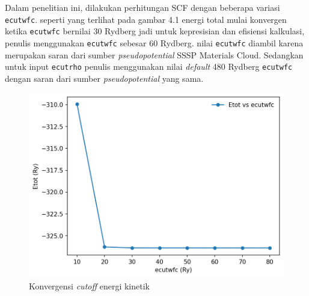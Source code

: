 Dalam penelitian ini, dilakukan perhitungan SCF dengan beberapa variasi \texttt{ecutwfc}. seperti yang terlihat pada gambar 4.1 energi total mulai konvergen ketika \texttt{ecutwfc} bernilai 30 Rydberg jadi untuk kepresisian dan efisiensi kalkulasi, penulis menggunakan \texttt{ecutwfc} sebesar 60 Rydberg. nilai \texttt{ecutwfc} diambil karena merupakan saran dari sumber \textit{pseudopotential} SSSP Materials Cloud. Sedangkan untuk input \texttt{ecutrho} penulis menggunakan nilai \textit{default} 480 Rydberg \texttt{ecutwfc} dengan saran dari sumber \textit{pseudopotential} yang sama.

\begin{figure}
    \centering
    \includegraphics[width=15cm]{./gambar/plot_ecut_sn.png}
    \caption{Konvergensi \textit{cutoff} energi kinetik}
    \label{fig:ecutwfc}
\end{figure}





